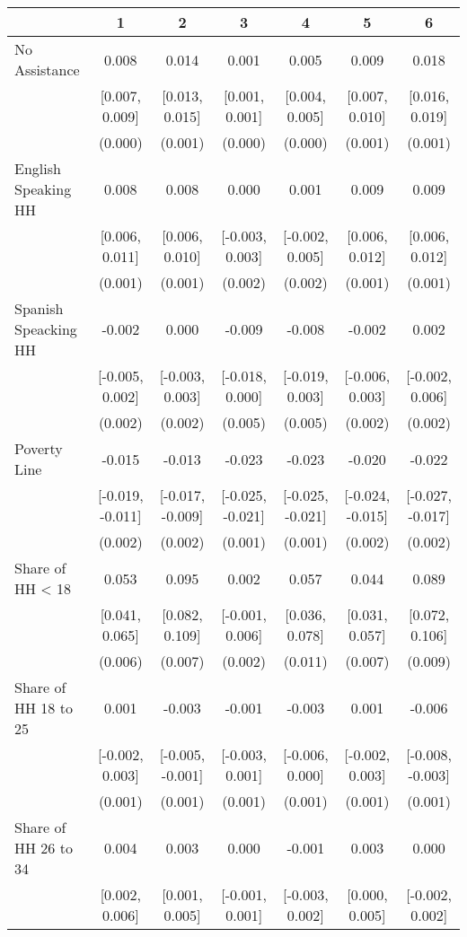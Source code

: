 \begin{table}[H]
\centering\begin{table}[H]
\centering
\begin{tabular}[t]{lcccccc}
\toprule
  & 1 & 2 & 3 & 4 & 5 & 6\\
\midrule
No Assistance & 0.008 & 0.014 & 0.001 & 0.005 & 0.009 & 0.018\\
 & [0.007, 0.009] & [0.013, 0.015] & [0.001, 0.001] & [0.004, 0.005] & [0.007, 0.010] & [0.016, 0.019]\\
 & (0.000) & (0.001) & (0.000) & (0.000) & (0.001) & (0.001)\\
English Speaking HH & 0.008 & 0.008 & 0.000 & 0.001 & 0.009 & 0.009\\
 & [0.006, 0.011] & [0.006, 0.010] & [-0.003, 0.003] & [-0.002, 0.005] & [0.006, 0.012] & [0.006, 0.012]\\
 & (0.001) & (0.001) & (0.002) & (0.002) & (0.001) & (0.001)\\
Spanish Speacking HH & -0.002 & 0.000 & -0.009 & -0.008 & -0.002 & 0.002\\
 & [-0.005, 0.002] & [-0.003, 0.003] & [-0.018, 0.000] & [-0.019, 0.003] & [-0.006, 0.003] & [-0.002, 0.006]\\
 & (0.002) & (0.002) & (0.005) & (0.005) & (0.002) & (0.002)\\
Poverty Line & -0.015 & -0.013 & -0.023 & -0.023 & -0.020 & -0.022\\
 & [-0.019, -0.011] & [-0.017, -0.009] & [-0.025, -0.021] & [-0.025, -0.021] & [-0.024, -0.015] & [-0.027, -0.017]\\
 & (0.002) & (0.002) & (0.001) & (0.001) & (0.002) & (0.002)\\
Share of HH < 18 & 0.053 & 0.095 & 0.002 & 0.057 & 0.044 & 0.089\\
 & [0.041, 0.065] & [0.082, 0.109] & [-0.001, 0.006] & [0.036, 0.078] & [0.031, 0.057] & [0.072, 0.106]\\
 & (0.006) & (0.007) & (0.002) & (0.011) & (0.007) & (0.009)\\
Share of HH 18 to 25 & 0.001 & -0.003 & -0.001 & -0.003 & 0.001 & -0.006\\
 & [-0.002, 0.003] & [-0.005, -0.001] & [-0.003, 0.001] & [-0.006, 0.000] & [-0.002, 0.003] & [-0.008, -0.003]\\
 & (0.001) & (0.001) & (0.001) & (0.001) & (0.001) & \vphantom{2} (0.001)\\
Share of HH 26 to 34 & 0.004 & 0.003 & 0.000 & -0.001 & 0.003 & 0.000\\
 & [0.002, 0.006] & [0.001, 0.005] & [-0.001, 0.001] & [-0.003, 0.002] & [0.000, 0.005] & [-0.002, 0.002]\\

\end{tabular}
\end{table}
\end{table}
